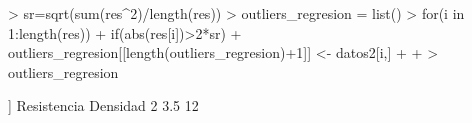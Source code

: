 \documentclass [a4paper] {article}
\begin{document}
\begin{Schunk}
\begin{Sinput}
> sr=sqrt(sum(res^2)/length(res))
> outliers_regresion = list()
> for(i in 1:length(res)){
+   if(abs(res[i])>2*sr){
+     outliers_regresion[[length(outliers_regresion)+1]] <- datos2[i,]
+   }
+ }
> outliers_regresion
\end{Sinput}
\begin{Soutput}
[[1]]
  Resistencia Densidad
2         3.5       12
\end{Soutput}
\end{Schunk}
\end{document}
